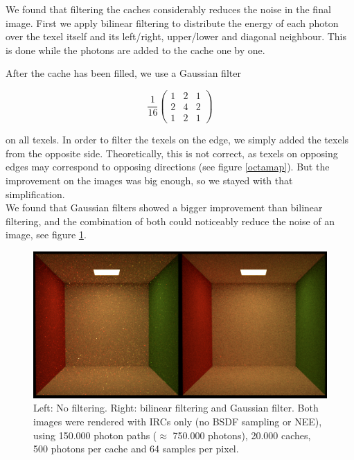 We found that filtering the caches considerably reduces the noise in the final image.
First we apply bilinear filtering to distribute the energy of each photon over the texel itself and its left/right, upper/lower and diagonal neighbour. This is done while the photons are added to the cache one by one.

After the cache has been filled, we use a Gaussian filter

\begin{equation*}
\frac{1}{16}\begin{pmatrix} 1 & 2 & 1 \\ 2 & 4 & 2 \\ 1 & 2 & 1 \end{pmatrix}
\end{equation*}

on all texels. In order to filter the texels on the edge, we simply added the texels from the opposite side. Theoretically, this is not correct, as texels on opposing edges may correspond to opposing directions (see figure \ref{octamap}). But the improvement on the images was big enough, so we stayed with that simplification.\\
We found that Gaussian filters showed a bigger improvement than bilinear filtering, and the combination of both could noticeably reduce the noise of an image, see figure \ref{filtervergleich}.\\

\begin{figure}[ht]
	\centering
  \includegraphics[width=1\textwidth]{bilder/filter/filtervergleich.png}
	\caption{Left: No filtering.\newline
Right: bilinear filtering and Gaussian filter.\newline
Both images were rendered with IRCs only (no BSDF sampling or NEE), using 150.000 photon paths ($\approx$ 750.000 photons), 20.000 caches, 500 photons per cache and 64 samples per pixel.}
	\label{filtervergleich}
\end{figure}



